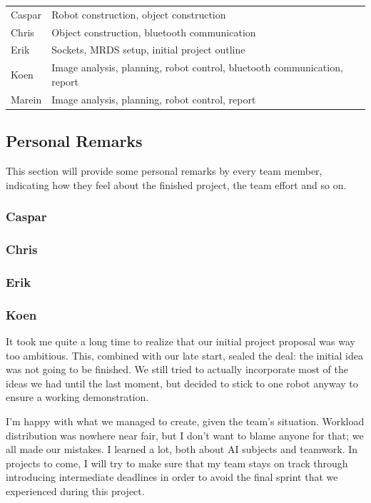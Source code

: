 \documentclass[10pt, abstracton, twocolumn]{scrartcl}
\begin{document}
\begin{appendices}
\begin{center}
	\begin{tabularx}{3.4in}{ l | X }
	Caspar & Robot construction, object construction \\ 
	Chris & Object construction, bluetooth communication \\ 
	Erik & Sockets, MRDS setup, initial project outline \\ 
	Koen & Image analysis, planning, robot control, bluetooth communication, report \\ 
	Marein & Image analysis, planning, robot control, report \\
	\end{tabularx}
\end{center}

\subsection{Personal Remarks}
This section will provide some personal remarks by every team member, indicating how they feel about the finished project, the team effort and so on.

\subsubsection{Caspar}


\subsubsection{Chris}


\subsubsection{Erik}


\subsubsection{Koen}
It took me quite a long time to realize that our initial project proposal was way too ambitious. This, combined with our late start, sealed the deal: the initial idea was not going to be finished. We still tried to actually incorporate most of the ideas we had until the last moment, but decided to stick to one robot anyway to ensure a working demonstration. 

I'm happy with what we managed to create, given the team's situation. Workload distribution was nowhere near fair, but I don't want to blame anyone for that; we all made our mistakes. I learned a lot, both about AI subjects and teamwork. In projects to come, I will try to make sure that my team stays on track through introducing intermediate deadlines in order to avoid the final sprint that we experienced during this project.


\end{appendices}
\end{document}
